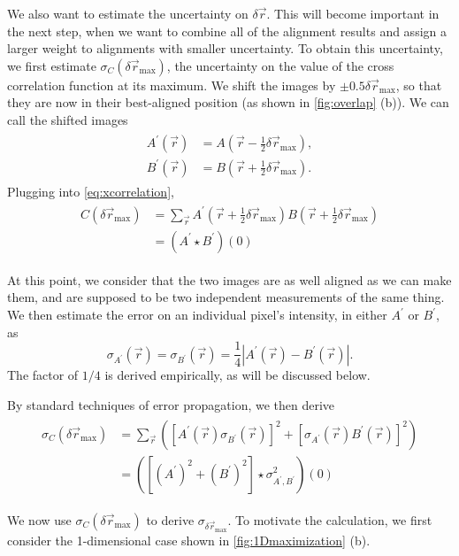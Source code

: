 \documentclass{article}
\begin{document}
We also want to estimate the uncertainty on $\delta\vec{r}$.  This will become important in the next step, when we want to combine all of the alignment results and assign a larger weight to alignments with smaller uncertainty.  To obtain this uncertainty, we first estimate $\sigma_C(\delta\vec{r}_\text{max})$, the uncertainty on the value of the cross correlation function at its maximum.  We shift the images by $\pm0.5\delta\vec{r}_\text{max}$, so that they are now in their best-aligned position (as shown in \cref{fig:overlap} (b)).  We can call the shifted images
\begin{align}
\begin{aligned}
A^\prime(\vec{r})&=A\left(\vec{r}-\frac{1}{2}\delta\vec{r}_\text{max}\right), \\
B^\prime(\vec{r})&=B\left(\vec{r}+\frac{1}{2}\delta\vec{r}_\text{max}\right).
\end{aligned}
\end{align}
Plugging into \cref{eq:xcorrelation},
\begin{align}
\begin{aligned}
C(\delta\vec{r}_\text{max})&=\sum_{\vec{r}}A^\prime\left(\vec{r}+\frac{1}{2}\delta\vec{r}_\text{max}\right) B\left(\vec{r}+\frac{1}{2}\delta\vec{r}_\text{max}\right) \\
&=(A^\prime\star B^\prime)(0)
\end{aligned}
\end{align}

At this point, we consider that the two images are as well aligned as we can make them, and are supposed to be two independent measurements of the same thing.  We then estimate the error on an individual pixel's intensity, in either $A^\prime$ or $B^\prime$, as
\begin{equation}
\sigma_{A^\prime}(\vec{r})=\sigma_{B^\prime}(\vec{r})=\frac{1}{4}\left|A^\prime(\vec{r})-B^\prime(\vec{r})\right|.
\end{equation}
The factor of $1/4$ is derived empirically, as will be discussed below.

By standard techniques of error propagation, we then derive
\begin{align}
\begin{aligned}
\sigma_C(\delta\vec{r}_\text{max})&=\sum_{\vec{r}}\left(\left[A^\prime(\vec{r})\sigma_{B^\prime}(\vec{r})\right]^2+\left[\sigma_{A^\prime}(\vec{r})B^\prime(\vec{r})\right]^2\right) \\
&=([(A^\prime)^2+(B^\prime)^2]\star\sigma_{A^\prime,B^\prime}^2)(0)
\end{aligned}
\end{align}


We now use $\sigma_C(\delta\vec{r}_\text{max})$ to derive $\sigma_{\delta\vec{r}_\text{max}}$.  To motivate the calculation, we first consider the 1-dimensional case shown in \cref{fig:1Dmaximization} (b).
\end{document}
